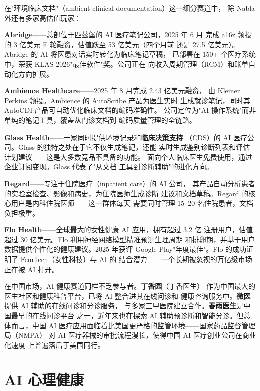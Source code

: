 在"环境临床文档"（ambient clinical documentation）这一细分赛道中，
除 Nabla 外还有多家高估值玩家：

\textbf{Abridge}——总部位于匹兹堡的 AI 医疗笔记公司，2025 年 6 月
完成 a16z 领投的 3 亿美元 E 轮融资，估值跃至 53 亿美元（四个月前
还是 27.5 亿美元）。Abridge 的 AI 将医患对话实时转化为临床笔记草稿，
已部署在 150+ 个医疗系统中，荣获 KLAS 2026"最佳软件"奖。公司正在
向收入周期管理（RCM）和账单自动化方向扩展。

\textbf{Ambience Healthcare}——2025 年 8 月完成 2.43 亿美元融资，
由 Kleiner Perkins 领投。Ambience 的 AutoScribe 产品为医生实时
生成就诊笔记，同时其 AutoCDI 产品可自动优化临床文档的编码准确性。
公司定位为"AI 操作系统"而非单纯的笔记工具，覆盖从门诊文档到
编码质量管理的全链路。

\textbf{Glass Health}——一家同时提供环境记录和\textbf{临床决策支持}
（CDS）的 AI 医疗公司。Glass 的独特之处在于它不仅生成笔记，还能
实时生成鉴别诊断列表和评估计划建议——这是大多数竞品不具备的功能。
面向个人临床医生免费使用，通过企业订阅变现。Glass 代表了"从文档
工具到诊断辅助"的进化方向。

\textbf{Regard}——专注于住院医疗（inpatient care）的 AI 公司，
其产品自动分析患者的实验室检查、影像和病史，为住院医师生成诊断
建议和文档草稿。Regard 的核心用户是内科住院医师——这一群体每天
需要同时管理 15--20 名住院患者，文档负担极重。

\textbf{Flo Health}——全球最大的女性健康 AI 应用，拥有超过 3.2 亿
注册用户，估值超过 30 亿美元。Flo 利用神经网络模型精准预测生理周期
和排卵期，并基于用户数据提供个性化的健康建议。2025 年获评 Google
Play"年度最佳"。Flo 的成功证明了 FemTech（女性科技）与 AI 的
结合潜力——一个长期被忽视的万亿级市场正在被 AI 打开。

在中国市场，AI 健康赛道同样不乏参与者。\textbf{丁香园}（丁香医生）
作为中国最大的医生社区和健康科普平台，已将 AI 整合进其在线问诊和
健康咨询服务中。\textbf{微医}提供 AI 辅助的在线问诊和分诊服务，
与多家三甲医院建立合作。\textbf{春雨医生}是中国最早的在线问诊平台
之一，近年来也在探索 AI 辅助预诊断和智能分诊。但总体而言，中国 AI
医疗应用面临着比美国更严格的监管环境——国家药品监督管理局（NMPA）
对 AI 医疗器械的审批流程漫长，使得中国 AI 医疗创业公司在商业化速度
上普遍落后于美国同行。



\section{AI 心理健康}
\label{sec:life-mental}

